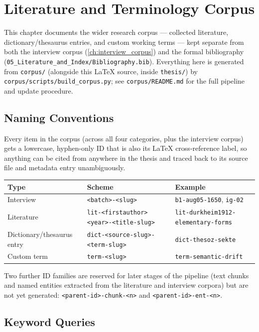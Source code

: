 \chapter{Literature and Terminology Corpus}\label{ch:literature_corpus}

This chapter documents the wider research corpus — collected literature,
dictionary/thesaurus entries, and custom working terms — kept separate from
both the interview corpus (\ref{ch:interview_corpus}) and the formal
bibliography (\texttt{05\_Literature\_and\_Index/Bibliography.bib}). Everything
here is generated from \texttt{corpus/} (alongside this LaTeX source, inside
\texttt{thesis/}) by \texttt{corpus/scripts/build\_corpus.py}; see
\texttt{corpus/README.md} for the full pipeline and update procedure.

\section{Naming Conventions}

Every item in the corpus (across all four categories, plus the interview
corpus) gets a lowercase, hyphen-only ID that is also its LaTeX cross-reference
label, so anything can be cited from anywhere in the thesis and traced back to
its source file and metadata entry unambiguously.

\begin{center}
\begin{tabular}{@{}lll@{}}
\toprule
Type & Scheme & Example \\
\midrule
Interview & \texttt{<batch>-<slug>} & \texttt{b1-aug05-1650}, \texttt{ig-02} \\
Literature & \texttt{lit-<firstauthor><year>-<title-slug>} & \texttt{lit-durkheim1912-elementary-forms} \\
Dictionary/thesaurus entry & \texttt{dict-<source-slug>-<term-slug>} & \texttt{dict-thesoz-sekte} \\
Custom term & \texttt{term-<slug>} & \texttt{term-semantic-drift} \\
\bottomrule
\end{tabular}
\end{center}

Two further ID families are reserved for later stages of the pipeline (text
chunks and named entities extracted from the literature and interview corpora)
but are not yet generated: \texttt{<parent-id>-chunk-<n>} and
\texttt{<parent-id>-ent-<n>}.

\section{Keyword Queries}\label{sec:keyword_queries}

